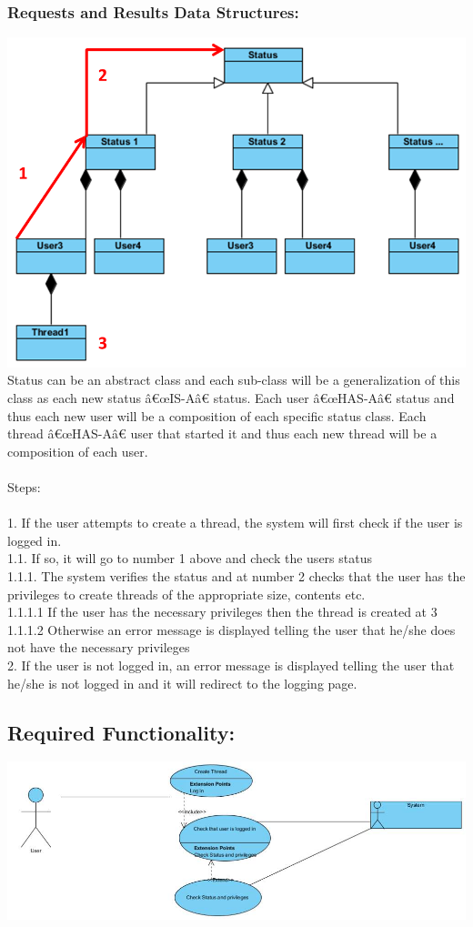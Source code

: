 \documentclass[a4paper,11pt]{article}
\begin{document}
\subsubsection*{Requests and Results Data Structures:}
\includegraphics{./Images/CRUDThread/Diagrams/1.png}
Status can be an abstract class and each sub-class will be a generalization of this class as each new status â€œIS-Aâ€ status.
Each user â€œHAS-Aâ€ status and thus each new user will be a composition of each specific status class.
Each thread â€œHAS-Aâ€ user that started it and thus each new thread will be a composition of each user.\\\\
Steps:\\\\
1.	If the user attempts to create a thread, the system will first check if the user is logged in.\\
1.1.	If so, it will go to number 1 above and check the users status\\
1.1.1.	The system verifies the status and at number 2 checks that the user has the privileges to create threads of the appropriate size, contents etc.\\
1.1.1.1	If the user has the necessary privileges then the thread is created at 3\\
1.1.1.2	Otherwise an error message is displayed telling the user that he/she does not have the necessary privileges \\
2.	If the user is not logged in, an error message is displayed telling the user that he/she is not logged in and it will redirect to the logging page.\\
\subsection{Required Functionality:} 
\includegraphics[width=1\linewidth]{./Images/CRUDThread/Diagrams/2.jpg}\\
\end{document}
